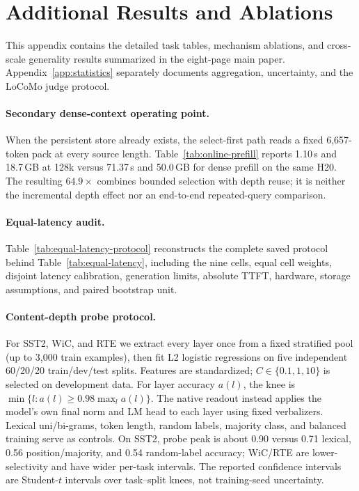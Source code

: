 \section{Additional Results and Ablations}
\label{sec:appendix}

This appendix contains the detailed task tables, mechanism ablations, and
cross-scale generality results summarized in the eight-page main paper.
Appendix~\ref{app:statistics} separately documents aggregation, uncertainty,
and the LoCoMo judge protocol.

\paragraph{Secondary dense-context operating point.}
When the persistent store already exists, the select-first path reads a fixed
6,657-token pack at every source length. Table~\ref{tab:online-prefill} reports
1.10\,s and 18.7\,GB at 128k versus 71.37\,s and 50.0\,GB for dense prefill on
the same H20. The resulting $64.9\times$ combines bounded selection with depth
reuse; it is neither the incremental depth effect nor an end-to-end
repeated-query comparison.



\paragraph{Equal-latency audit.}
Table~\ref{tab:equal-latency-protocol} reconstructs the complete saved protocol
behind Table~\ref{tab:equal-latency}, including the nine cells, equal cell
weights, disjoint latency calibration, generation limits, absolute TTFT,
hardware, storage assumptions, and paired bootstrap unit.



\paragraph{Content-depth probe protocol.}
For SST2, WiC, and RTE we extract every layer once from a fixed stratified pool
(up to 3,000 train examples), then fit L2 logistic regressions on five independent
60/20/20 train/dev/test splits. Features are standardized; $C\in\{0.1,1,10\}$
is selected on development data. For layer accuracy $a(l)$, the knee is
$\min\{l:a(l)\geq0.98\max_l a(l)\}$. The native readout instead applies the
model's own final norm and LM head to each layer using fixed verbalizers. Lexical
uni/bi-grams, token length, random labels, majority class, and balanced training
serve as controls. On SST2, probe peak is about 0.90 versus 0.71 lexical, 0.56
position/majority, and 0.54 random-label accuracy; WiC/RTE are lower-selectivity
and have wider per-task intervals. The reported confidence intervals are
Student-$t$ intervals over task--split knees, not training-seed uncertainty.

